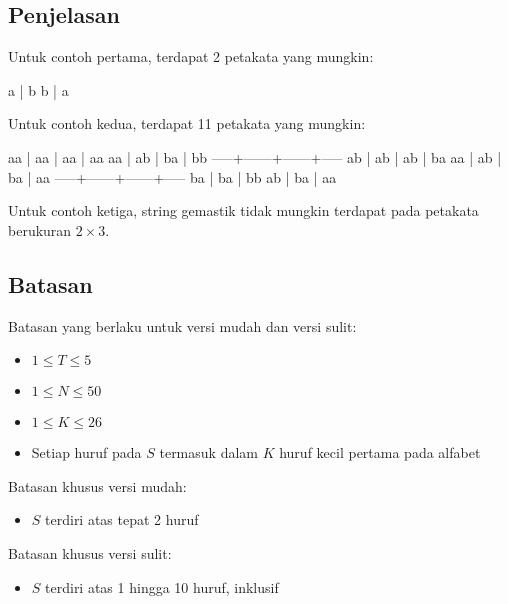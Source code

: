 \documentclass[../main_problemset.tex]{subfiles} %
\begin{document}
\pagebreak
\subsection*{Penjelasan}

Untuk contoh pertama, terdapat 2 petakata yang mungkin:

\begin{lcverbatim}
a  |  b
b  |  a
\end{lcverbatim}

Untuk contoh kedua, terdapat 11 petakata yang mungkin:

\begin{lcverbatim}
 aa  |  aa  |  aa  |  aa
 aa  |  ab  |  ba  |  bb
-----+------+------+-----
 ab  |  ab  |  ab  |  ba
 aa  |  ab  |  ba  |  aa
-----+------+------+-----
 ba  |  ba  |  bb
 ab  |  ba  |  aa
\end{lcverbatim}

Untuk contoh ketiga, string gemastik tidak mungkin terdapat pada petakata berukuran $ 2 \times 3 $.

\subsection*{Batasan}

\begin{minipage}[t]{0.47\textwidth}

Batasan yang berlaku untuk versi mudah dan versi sulit:

\begin{itemize}
	\item $ 1 \le T \le 5 $
	\item $ 1 \le N \le 50 $
	\item $ 1 \le K \le 26 $
	\item Setiap huruf pada $ S $ termasuk dalam $ K $ huruf kecil pertama pada alfabet
\end{itemize}
\end{minipage}
\begin{minipage}[t]{0.06\textwidth}
    \hfill
\end{minipage}
\begin{minipage}[t]{0.47\textwidth}
Batasan khusus versi mudah:

\begin{itemize}
	\item $ S $ terdiri atas tepat 2 huruf
\end{itemize}

\vspace{.2cm}

Batasan khusus versi sulit:

\begin{itemize}
	\item $ S $ terdiri atas 1 hingga 10 huruf, inklusif
\end{itemize}
\end{minipage}
\end{document}
